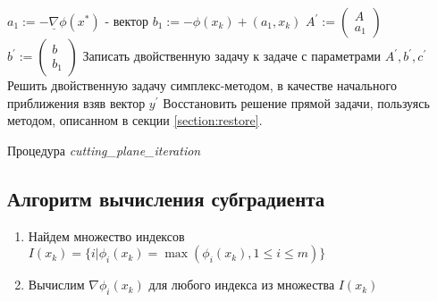\documentclass[main.tex]{subfiles}
\begin{document}
\begin{algorithm}[H]
	 
	$a_1 := - \underline{\nabla} \phi(x^*)$ - вектор\;
	$b_1 :=  - \phi(x_k)+ (a_1, x_k)$ \;
	$A^{'} := \begin{pmatrix}A\\a_1\end{pmatrix}$ \;
	$b^{'} := \begin{pmatrix}b\\b_1\end{pmatrix}$\;
	Записать двойственную задачу к задаче с параметрами $A^{'}, b^{'}, c^{'}$\;
	Решить двойственную задачу симплекс-методом, в качестве начального приближения взяв вектор $y^{'}$\;
	Восстановить решение прямой задачи, пользуясь методом, описанном в секции \ref{section:restore}.
	
	\caption{Процедура \emph{cutting\_plane\_iteration}}
\end{algorithm}

\subsection{Алгоритм вычисления субградиента}
\begin{enumerate}
	\item Найдем множество индексов $I(x_k) = \{i | \phi_i(x_k)=\max(\phi_i(x_k), 1 \leq i \leq m)\} $
	\item Вычислим  $\nabla\phi_i(x_k)$ для любого индекса из множества $I(x_k)$ 
\end{enumerate}

 
\end{document}
